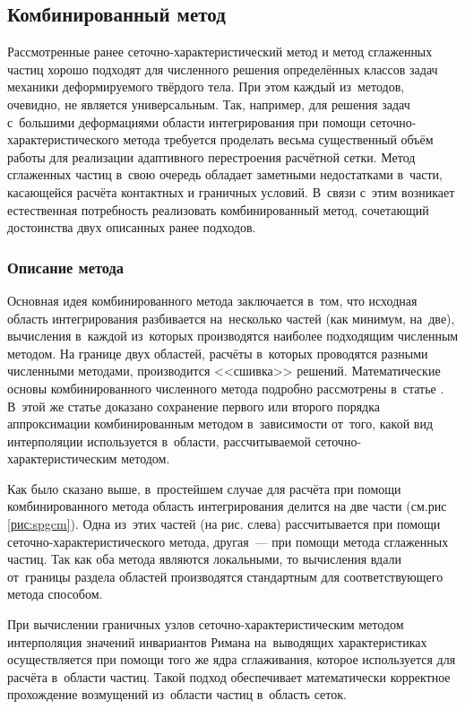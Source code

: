 \documentclass[thesis.tex]{subfiles}
\begin{document}
\subsection{Комбинированный метод}

Рассмотренные ранее сеточно-характеристический метод и метод сглаженных частиц хорошо подходят для численного решения
определённых классов задач механики деформируемого твёрдого тела. При этом каждый из~методов, очевидно, не является
универсальным. Так, например, для решения задач с~большими деформациями области интегрирования при помощи сеточно-характеристического
метода требуется проделать весьма существенный объём работы для реализации адаптивного перестроения
расчётной сетки. Метод сглаженных частиц в~свою очередь обладает заметными недостатками в~части, касающейся расчёта
контактных и граничных условий. В~связи с~этим возникает естественная потребность реализовать комбинированный метод,
сочетающий достоинства двух описанных ранее подходов.

\subsubsection{Описание метода}

Основная идея комбинированного метода заключается в~том, что исходная область интегрирования разбивается на~несколько
частей (как минимум, на~две), вычисления в~каждой из~которых производятся наиболее подходящим численным методом. На
границе двух областей, расчёты в~которых проводятся разными численными методами, производится <<сшивка>> решений.
Математические основы комбинированного численного метода подробно рассмотрены в~статье \cite{петров2014схм}. В~этой же
статье доказано сохранение первого или второго порядка аппроксимации комбинированным методом в~зависимости от~того,
какой вид интерполяции используется в~области, рассчитываемой сеточно-характеристическим методом.

Как было сказано выше, в~простейшем случае для расчёта при помощи комбинированного метода область интегрирования делится
на две части (см.рис \ref{рис:spgcm}). Одна из~этих частей (на рис. слева) рассчитывается при помощи
сеточно-характеристического метода, другая~--- при помощи метода сглаженных частиц. Так как оба метода являются
локальными, то вычисления вдали от~границы раздела областей производятся стандартным для соответствующего метода
способом.

При вычислении граничных узлов сеточно-характеристическим методом интерполяция значений инвариантов Римана на~выводящих
характеристиках осуществляется при помощи того же ядра сглаживания, которое используется для расчёта в~области частиц.
Такой подход обеспечивает математически корректное прохождение возмущений из~области частиц в~область сеток.
\end{document}
